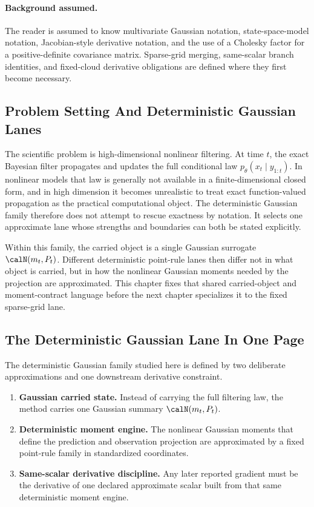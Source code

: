 \paragraph{Background assumed.}
The reader is assumed to know multivariate Gaussian notation, state-space-model
notation, Jacobian-style derivative notation, and the use of a Cholesky factor
for a positive-definite covariance matrix.  Sparse-grid merging, same-scalar
branch identities, and fixed-cloud derivative obligations are defined where they
first become necessary.

\subsection{Problem Setting And Deterministic Gaussian Lanes}
\label{sec:bf-hd-gq-problem-lane}

The scientific problem is high-dimensional nonlinear filtering.  At time
\(t\), the exact Bayesian filter propagates and updates the full conditional law
\(p_\theta(x_t\mid y_{1:t})\).  In nonlinear models that law is generally not
available in a finite-dimensional closed form, and in high dimension it becomes
unrealistic to treat exact function-valued propagation as the practical
computational object.  The deterministic Gaussian family therefore does not
attempt to rescue exactness by notation.  It selects one approximate lane whose
strengths and boundaries can both be stated explicitly.

Within this family, the carried object is a single Gaussian surrogate
\(\calN(m_t,P_t)\).  Different deterministic point-rule lanes then differ not in
what object is carried, but in how the nonlinear Gaussian moments needed by the
projection are approximated.  This chapter fixes that shared carried-object and
moment-contract language before the next chapter specializes it to the fixed
sparse-grid lane.

\subsection{The Deterministic Gaussian Lane In One Page}
\label{sec:bf-hd-gq-one-page}

The deterministic Gaussian family studied here is defined by two deliberate
approximations and one downstream derivative constraint.
\begin{enumerate}[leftmargin=0.28in]
  \item \textbf{Gaussian carried state.}  Instead of carrying the full filtering
  law, the method carries one Gaussian summary \(\calN(m_t,P_t)\).
  \item \textbf{Deterministic moment engine.}  The nonlinear Gaussian moments that
  define the prediction and observation projection are approximated by a fixed
  point-rule family in standardized coordinates.
  \item \textbf{Same-scalar derivative discipline.}  Any later reported gradient must
  be the derivative of one declared approximate scalar built from that same
  deterministic moment engine.
\end{enumerate}

